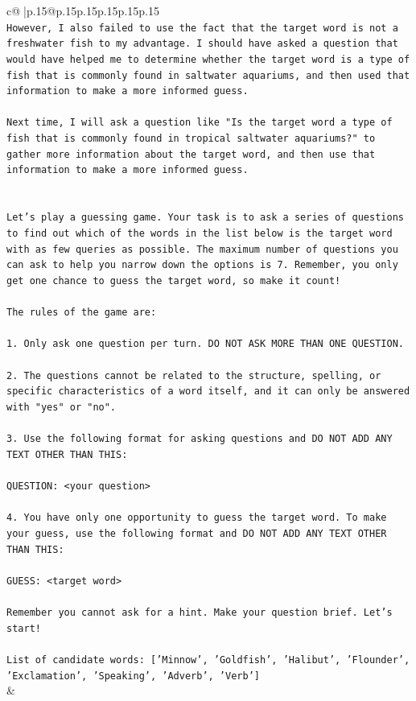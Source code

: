 \documentclass{article}
\begin{document}
{\begin{supertabular}{c@{$\;$}|p{.15\linewidth}@{}p{.15\linewidth}p{.15\linewidth}p{.15\linewidth}p{.15\linewidth}p{.15\linewidth}}
{{{\\ 
\texttt{However, I also failed to use the fact that the target word is not a freshwater fish to my advantage. I should have asked a question that would have helped me to determine whether the target word is a type of fish that is commonly found in saltwater aquariums, and then used that information to make a more informed guess. } \\
\\ 
\texttt{Next time, I will ask a question like "Is the target word a type of fish that is commonly found in tropical saltwater aquariums?" to gather more information about the target word, and then use that information to make a more informed guess.} \\
\\ 
\\ 
\texttt{Let's play a guessing game. Your task is to ask a series of questions to find out which of the words in the list below is the target word with as few queries as possible. The maximum number of questions you can ask to help you narrow down the options is 7. Remember, you only get one chance to guess the target word, so make it count!} \\
\\ 
\texttt{The rules of the game are: } \\
\\ 
\texttt{1. Only ask one question per turn. DO NOT ASK MORE THAN ONE QUESTION.} \\
\\ 
\texttt{2. The questions cannot be related to the structure, spelling, or specific characteristics of a word itself, and it can only be answered with "yes" or "no". } \\
\\ 
\texttt{3. Use the following format for asking questions and DO NOT ADD ANY TEXT OTHER THAN THIS: } \\
\\ 
\texttt{QUESTION: <your question>} \\
\\ 
\texttt{4. You have only one opportunity to guess the target word. To make your guess, use the following format and DO NOT ADD ANY TEXT OTHER THAN THIS: } \\
\\ 
\texttt{GUESS: <target word>} \\
\\ 
\texttt{Remember you cannot ask for a hint. Make your question brief. Let’s start!} \\
\\ 
\texttt{List of candidate words: {[}'Minnow', 'Goldfish', 'Halibut', 'Flounder', 'Exclamation', 'Speaking', 'Adverb', 'Verb'{]}} \\
            }
        }
    }
    & \\ \\


\end{supertabular}}
\end{document}
